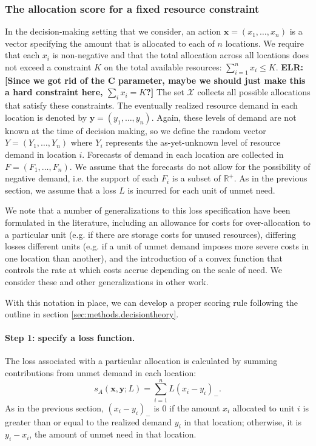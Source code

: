 \documentclass{article}
\def\elr#1{{\color{cyan}\textbf{ELR:[#1]}}}
\begin{document}
\subsubsection{The allocation score for a fixed resource constraint}

In the decision-making setting that we consider, an action $\mathbf{x} = (x_1, \ldots, x_n)$ is a vector specifying the amount that is allocated to each of $n$ locations. We require that each $x_i$ is non-negative and that the total allocation across all locations does not exceed a constraint $K$ on the total available resources: $\sum_{i=1}^n x_i \leq K$. \elr{Since we got rid of the C parameter, maybe we should just make this a hard constraint here, $\sum_i x_i = K$?} The set $\mathcal{X}$ collects all possible allocations that satisfy these constraints. The eventually realized resource demand in each location is denoted by $\mathbf{y} = (y_1, \ldots, y_n)$. Again, these levels of demand are not known at the time of decision making, so we define the random vector $Y = (Y_1, \ldots, Y_n)$ where $Y_i$ represents the as-yet-unknown level of resource demand in location $i$. Forecasts of demand in each location are collected in $F = (F_1, \ldots, F_n)$. We assume that the forecasts do not allow for the possibility of negative demand, i.e. the support of each $F_i$ is a subset of $\mathbb{R}^+$. As in the previous section, we assume that a loss $L$ is incurred for each unit of unmet need.

We note that a number of generalizations to this loss specification have been formulated in the literature, including an allowance for costs for over-allocation to a particular unit (e.g. if there are storage costs for unused resources), differing losses different units (e.g. if a unit of unmet demand imposes more severe costs in one location than another), and the introduction of a convex function that controls the rate at which costs accrue depending on the scale of need. We consider these and other generalizations in other work.

With this notation in place, we can develop a proper scoring rule following the outline in section \ref{sec:methods.decisiontheory}.

\paragraph{Step 1: specify a loss function.} The loss associated with a particular allocation is calculated by summing contributions from unmet demand in each location:
\begin{equation}
s_A(\mathbf{x}, \mathbf{y}; L) = \sum_{i=1}^n L (x_i - y_i)_-. \label{eqn:loss_fn}
\end{equation}
As in the previous section, $(x_i - y_i)_-$ is $0$ if the amount $x_i$ allocated to unit $i$ is greater than or equal to the realized demand $y_i$ in that location; otherwise, it is $y_i - x_i$, the amount of unmet need in that location.
\end{document}
